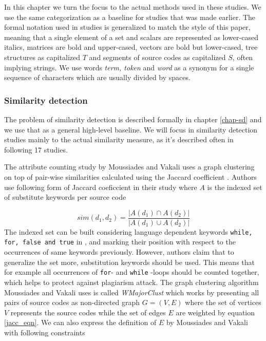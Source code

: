 In this chapter we turn the focus to the actual methods used in these studies. We use the same categorization as a baseline for studies that was made earlier. The formal notation used in studies is generalized to match the style of this paper, meaning that a single element of a set and scalars are represented as lower-cased italics, matrices are bold and upper-cased, vectors are bold but lower-cased, tree structures as capitalized $T$ and segments of source codes as capitalized $S$, often implying strings. We use words \emph{term, token} and \emph{word} as a synonym for a single sequence of characters which are usually divided by spaces.

\subsubsection{Similarity detection}
The problem of similarity detection is described formally in chapter \ref{chap-sd} and we use that as a general high-level baseline. We will focus in similarity detection studies mainly to the actual similarity measure, as it's described often in following 17 studies.


The attribute counting study by Moussiades and Vakali uses a graph clustering on top of pair-wise similarities calculated using the Jaccard coefficient \cite{PACASCD2005}. Authors use following form of Jaccard coeficcient in their study where $A$ is the indexed set of substitute keywords per source code 

\begin{equation}\label{jacc_eqn}
    sim(d_1, d_2) = \dfrac{|A(d_1) \cap A(d_2)|}{|A(d_1) \cup A(d_2)|}
\end{equation}
\noindent
The indexed set can be built considering language dependent keywords \eg \texttt{while, for, false and true} in \cpp, and marking their position with respect to the occurrences of same keywords previously. However, authors claim that to generalize the set more, substitution keywords should be used. This means that for example all occurrences of \texttt{for}- and \texttt{while} -loops should be counted together, which helps to protect against plagiarism attack. The graph clustering algorithm Moussiades and Vakali uses is called \emph{WMajorClust} which works by presenting all pairs of source codes as non-directed graph $G = (V, E)$ where the set of vertices $V$ represents the source codes while the set of edges $E$ are weighted by equation \ref{jacc_eqn}. We can also express the definition of $E$ by Moussiades and Vakali with following constraints


